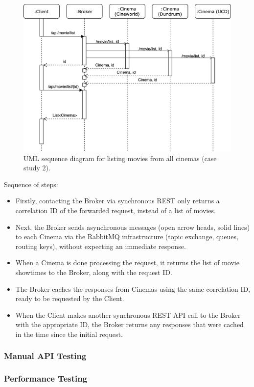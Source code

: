 \begin{figure}[H]
	\centering
	\includegraphics[width=0.75\linewidth]{./assets/diagrams/cs02-sequence.png}
	\caption{UML sequence diagram for listing movies from all cinemas (case study 2).}
	\label{fig:cs02-sequence}
\end{figure}

Sequence of steps:
\begin{itemize}
	\item Firstly, contacting the Broker via synchronous REST only returns a correlation ID of the forwarded request, instead of a list of movies.
	\item Next, the Broker sends asynchronous messages (open arrow heads, solid lines) to each Cinema via the RabbitMQ infrastructure (topic exchange, queues, routing keys), without expecting an immediate response.
	\item When a Cinema is done processing the request, it returns the list of movie showtimes to the Broker, along with the request ID.
	\item The Broker caches the responses from Cinemas using the same correlation ID, ready to be requested by the Client.
	\item When the Client makes another synchronous REST API call to the Broker with the appropriate ID, the Broker returns any responses that were cached in the time since the initial request.
\end{itemize}

\subsubsection{Manual API Testing}
\subsubsection{Performance Testing}
